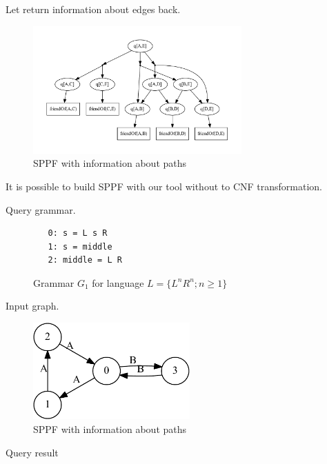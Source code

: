 \documentclass{sig-alternate}
\begin{document}
Let return information about edges back.


\begin{figure}[h]
    \begin{center}
        \includegraphics[width=8cm]{resultSPPF1.pdf}
        \caption{SPPF with information about paths}
        \label{SPPF2}        
    \end{center}
\end{figure}


It is possible to build SPPF with our tool without to CNF transformation.

Query grammar.
\begin{figure}[h]
   \begin{center}
\begin{verbatim}
   0: s = L s R 
   1: s = middle
   2: middle = L R
\end{verbatim}
   \caption{Grammar $G_1$ for language $L=\{L^n R^n; n \geq 1\}$}
   \label{grammarG}        
   \end{center}
\end{figure}


Input graph.

\begin{figure}[h]
    \begin{center}
        \includegraphics[width=6cm]{input.pdf}
        \caption{SPPF with information about paths}
        \label{SPPF2}        
    \end{center}
\end{figure}

Query result
\end{document}
